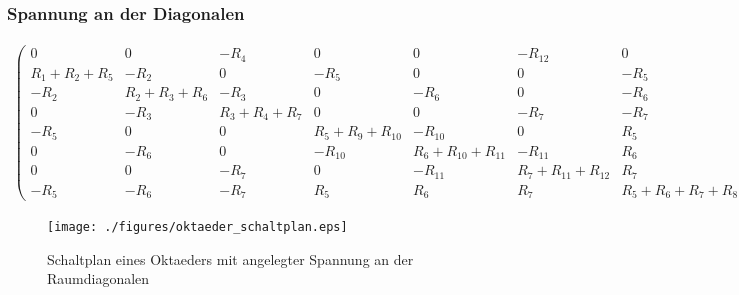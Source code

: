\documentclass[10pt,a4paper]{article}
\begin{document}
\begin{landscape}
\subsubsection{Spannung an der Diagonalen}
\begin{align}
\begin{pmatrix}
	0 & 0 & -R_4 & 0 & 0 & -R_{12} & 0 & R_4 + R_{12} \\
	R_1 + R_2 + R_5 & -R_2 & 0 & -R_5 & 0 & 0 &-R_5 & 0 \\
	-R_2 & R_2 + R_3 + R_6 & -R_3 & 0 & -R_6 & 0 & -R_6 & 0 \\
	0 & -R_3 & R_3 + R_4 + R_7 & 0 & 0 & -R_7 & -R_7 & -R_4 \\
	-R_5 & 0 & 0 & R_5 + R_9 + R_{10} & -R_{10} & 0 & R_5 & 0 \\
	0 & -R_6 & 0 & -R_{10} & R_6 + R_{10} + R_{11} & -R_{11} & R_6 & 0 \\
	0 & 0 & -R_7 & 0 & -R_{11} & R_7 + R_{11} + R_{12} & R_7 & -R_{12} \\
	-R_5 & -R_6 & -R_7 & R_5 & R_6 & R_7 & R_5 + R_6 + R_7 + R_8 & 0
\end{pmatrix}
\begin{pmatrix}
I_1\\ I_2\\ I_3\\I_4\\I_5\\I_6\\I_7\\I_{ges}
\end{pmatrix}
=
\begin{pmatrix}
U\\0\\0\\0\\0\\0\\0\\0
\end{pmatrix}
\label{eqn:oktaeder_ganz}
\end{align}
\begin{figure}[htbp!]
\centering
\texttt{[image: ./figures/oktaeder\_schaltplan.eps]}
\caption{Schaltplan eines Oktaeders mit angelegter Spannung an der Raumdiagonalen}
\label{fig:oktaeder_schaltplan}
\end{figure}
\thispagestyle{empty}

\end{landscape}
\end{document}
